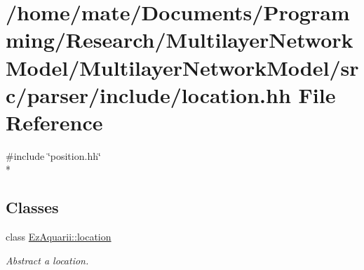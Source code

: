 \hypertarget{location_8hh}{}\section{/home/mate/\+Documents/\+Programming/\+Research/\+Multilayer\+Network\+Model/\+Multilayer\+Network\+Model/src/parser/include/location.hh File Reference}
\label{location_8hh}
{\ttfamily \#include \char`\"{}position.\+hh\char`\"{}}\\*
\subsection*{Classes}
\begin{DoxyCompactItemize}
\item 
class \hyperlink{classEzAquarii_1_1location}{Ez\+Aquarii\+::location}
\begin{DoxyCompactList}\small\item\em Abstract a location. \end{DoxyCompactList}\end{DoxyCompactItemize}
